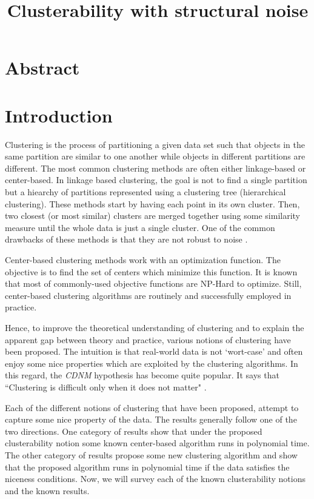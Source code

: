 \documentclass[twoside]{article}
\title{\LARGE Clusterability with structural noise}
\author{}
\begin{document}
\maketitle


\section{Abstract}

\section{Introduction}
Clustering is the process of partitioning a given data set such that objects in the same partition are similar to one another while objects in different partitions are different. The most common clustering methods are often either linkage-based or center-based. In linkage based clustering, the goal is not to find a single partition but a hiearchy of partitions represented using a clustering tree (hierarchical clustering). These methods start by having each point in its own cluster. Then, two closest (or most similar) clusters are merged together using some similarity measure until the whole data is just a single cluster. One of the common drawbacks of these methods is that they are not robust to noise \cite{narasimhan2005q}. 

Center-based clustering methods work with an optimization function. The objective is to find the set of centers which minimize this function. It is known that most of commonly-used objective functions are NP-Hard to optimize. Still, center-based clustering algorithms are routinely and successfully employed in practice.

Hence, to improve the theoretical understanding of clustering and to explain the apparent gap between theory and practice, various notions of clustering have been proposed. The intuition is that real-world data is not `wort-case' and often enjoy some nice properties which are exploited by the clustering algorithms. In this regard, the \emph{CDNM} hypothesis has become quite popular. It says that ``Clustering is difficult only when it does not matter" \cite{daniely2012clustering}.    

Each of the different notions of clustering that have been proposed, attempt to capture some nice property of the data. The results generally follow one of the two directions. One category of results show that under the proposed clusterability notion some known center-based algorithm runs in polynomial time. The other category of results propose some new clustering algorithm and show that the proposed algorithm runs in polynomial time if the data satisfies the niceness conditions. Now, we will survey each of the known clusterability notions and the known results.
\end{document}
